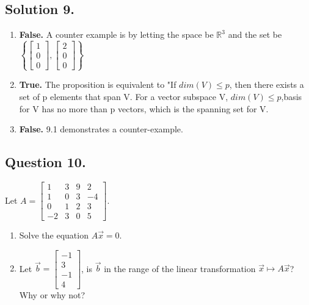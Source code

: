 \documentclass{article}
\begin{document}
\subsection*{Solution 9.}
\begin{enumerate}
    \item \textbf{False.} A counter example is by letting the space be $\mathbb{R}^3$ and the set be $\left\{\left[\begin{array}{c}1\\0\\0\end{array}\right],\left[\begin{array}{c}2\\0\\0\end{array}\right]\right\}$
    \item \textbf{True.} The proposition is equivalent to "If $dim(V)\leq p$, then there exists a set of p elements that span V. For a vector subspace V, $dim(V)\leq p$,basis for V has no more than p vectors, which is the spanning set for V. 
    \item \textbf{False.} 9.1 demonstrates a counter-example.
\end{enumerate}
\subsection*{Question 10.}
Let $A=\left[\begin{array}{cccc}
1&3&9&2\\1&0&3&-4\\0&1&2&3\\-2&3&0&5 
\end{array}\right]$.
\begin{enumerate}
    \item Solve the equation $A\Vec{x}=0$.
    \item Let $\Vec{b}=\left[\begin{array}{cccc}-1\\3\\-1\\4
    \end{array}\right]$, is $\Vec{b}$ in the range of the linear transformation $\Vec{x}\mapsto A\Vec{x}$? Why or why not?
\end{enumerate}
\end{document}
